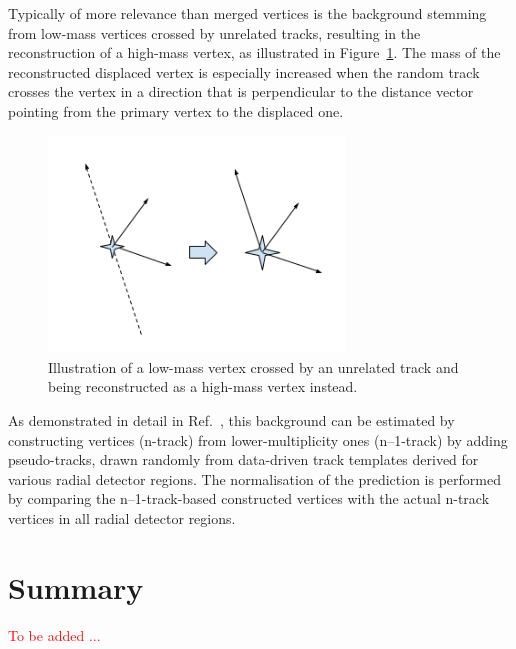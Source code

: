 Typically of more relevance than merged vertices is the background stemming from low-mass vertices crossed by unrelated tracks, resulting in the reconstruction of a high-mass vertex, as illustrated in Figure~\ref{fig:randomcrossing}. The mass of the reconstructed displaced vertex is especially increased when the random track crosses the vertex in a direction that is perpendicular to the distance vector pointing from the primary vertex to the displaced one.

\begin{figure}[h]
  \centering
  \includegraphics[width=0.7\textwidth]{figures/randomcrossing.png}
  \caption{Illustration of a low-mass vertex crossed by an unrelated track and being reconstructed as a high-mass vertex instead.}
  \label{fig:randomcrossing}
\end{figure}

As demonstrated in detail in Ref.~\cite{Aaboud:2017iio}, this background can be estimated by constructing vertices (n-track) from lower-multiplicity ones (n--1-track) by adding pseudo-tracks, drawn randomly from data-driven track templates derived for various radial detector regions. The normalisation of the prediction is performed by comparing the n--1-track-based constructed vertices with the actual n-track vertices in all radial detector regions.

\section{Summary} %

\textcolor{red}{To be added ...}
